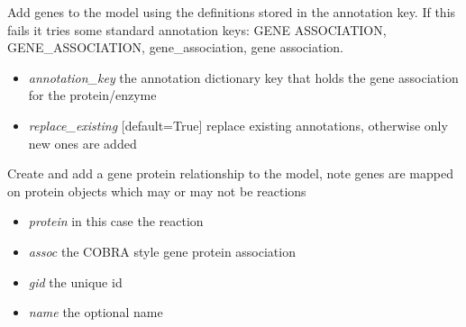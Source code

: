 \documentclass[a4paper,11pt,english]{sphinxmanual}
\begin{document}
\begin{fulllineitems}
\begin{fulllineitems}
\begin{itemize}
\end{itemize}

\end{fulllineitems}


\begin{fulllineitems}
\label{modules_doc:cbmpy.CBModel.Model.createGeneAssociationsFromAnnotations}
Add genes to the model using the definitions stored in the annotation key. If this fails it tries some standard annotation
keys: GENE ASSOCIATION, GENE\_ASSOCIATION, gene\_association, gene association.
\begin{itemize}
\item {} 
\emph{annotation\_key} the annotation dictionary key that holds the gene association for the protein/enzyme

\item {} 
\emph{replace\_existing} {[}default=True{]} replace existing annotations, otherwise only new ones are added

\end{itemize}

\end{fulllineitems}


\begin{fulllineitems}
\label{modules_doc:cbmpy.CBModel.Model.createGeneProteinAssociation}
Create and add a gene protein relationship to the model, note genes are mapped on protein objects which may or may not be reactions
\begin{itemize}
\item {} 
\emph{protein} in this case the reaction

\item {} 
\emph{assoc} the COBRA style gene protein association

\item {} 
\emph{gid} the unique id

\item {} 
\emph{name} the optional name


\end{itemize}
\end{fulllineitems}
\end{fulllineitems}
\end{document}
